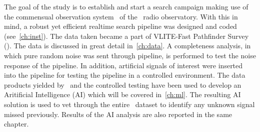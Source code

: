 \par The goal of the study is to establish and start a search campaign making use of the commensual observation system \vlite~of the \vla~radio observatory.
With this in mind, a robust yet efficient realtime search pipeline was designed and coded (see~\autoref{ch:inst}).
The data taken became a part of VLITE-Fast Pathfinder Survey (\vfps). The data is discussed in great detail in~\autoref{ch:data}.
A completeness analysis, in which pure random noise was sent through pipeline, is performed to test the noise response of the pipeline. In addition, artificial signals of interest were inserted into the pipeline for testing the pipeline in a controlled environment. 
The data products yielded by \vfps~and the controlled testing have been used to develop an Aritificial Intelligence (AI) which will be covered in~\autoref{ch:ml}.
The resulting AI solution is used to vet through the entire \vfps~dataset to identify any unknown signal missed previously. Results of the AI analysis are also reported in the same chapter. 


